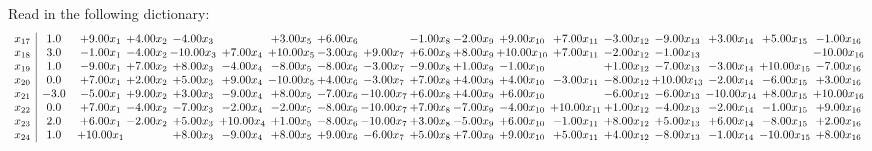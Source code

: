 \documentclass[9pt]{article}
\begin{document}
Read in the following dictionary:
\[\begin{array}{c| c c@{\hskip 2pt} c@{\hskip 2pt} c@{\hskip 2pt} c@{\hskip 2pt} c@{\hskip 2pt} c@{\hskip 2pt} c@{\hskip 2pt} c@{\hskip 2pt} c@{\hskip 2pt} c@{\hskip 2pt} c@{\hskip 2pt} c@{\hskip 2pt} c@{\hskip 2pt} c@{\hskip 2pt} c@{\hskip 2pt} c@{\hskip 2pt} }
 x_{17}   &  1.0 & +  9.00 x_{1} & +  4.00 x_{2} & -4.00 x_{3} &   & +  3.00 x_{5} & +  6.00 x_{6} &   & -1.00 x_{8} & -2.00 x_{9} & +  9.00 x_{10} & +  7.00 x_{11} & -3.00 x_{12} & -9.00 x_{13} & +  3.00 x_{14} & +  5.00 x_{15} & -1.00 x_{16}\\
 x_{18}   &  3.0 & -1.00 x_{1} & -4.00 x_{2} & -10.00 x_{3} & +  7.00 x_{4} & + 10.00 x_{5} & -3.00 x_{6} & +  9.00 x_{7} & +  6.00 x_{8} & +  8.00 x_{9} & + 10.00 x_{10} & +  7.00 x_{11} & -2.00 x_{12} & -1.00 x_{13} &    &   & -10.00 x_{16}\\
 x_{19}   &  1.0 & -9.00 x_{1} & +  7.00 x_{2} & +  8.00 x_{3} & -4.00 x_{4} & -8.00 x_{5} & -8.00 x_{6} & -3.00 x_{7} & -9.00 x_{8} & +  1.00 x_{9} & -1.00 x_{10} &   & +  1.00 x_{12} & -7.00 x_{13} & -3.00 x_{14} & + 10.00 x_{15} & -7.00 x_{16}\\
 x_{20}   &  0.0 & +  7.00 x_{1} & +  2.00 x_{2} & +  5.00 x_{3} & +  9.00 x_{4} & -10.00 x_{5} & +  4.00 x_{6} & -3.00 x_{7} & +  7.00 x_{8} & +  4.00 x_{9} & +  4.00 x_{10} & -3.00 x_{11} & -8.00 x_{12} & + 10.00 x_{13} & -2.00 x_{14} & -6.00 x_{15} & +  3.00 x_{16}\\
 x_{21}   &  -3.0 & -5.00 x_{1} & +  9.00 x_{2} & +  3.00 x_{3} & -9.00 x_{4} & +  8.00 x_{5} & -7.00 x_{6} & -10.00 x_{7} & +  6.00 x_{8} & +  4.00 x_{9} & +  6.00 x_{10} &   & -6.00 x_{12} & -6.00 x_{13} & -10.00 x_{14} & +  8.00 x_{15} & + 10.00 x_{16}\\
 x_{22}   &  0.0 & +  7.00 x_{1} & -4.00 x_{2} & -7.00 x_{3} & -2.00 x_{4} & -2.00 x_{5} & -8.00 x_{6} & -10.00 x_{7} & +  7.00 x_{8} & -7.00 x_{9} & -4.00 x_{10} & + 10.00 x_{11} & +  1.00 x_{12} & -4.00 x_{13} & -2.00 x_{14} & -1.00 x_{15} & +  9.00 x_{16}\\
 x_{23}   &  2.0 & +  6.00 x_{1} & -2.00 x_{2} & +  5.00 x_{3} & + 10.00 x_{4} & +  1.00 x_{5} & -8.00 x_{6} & -10.00 x_{7} & +  3.00 x_{8} & -5.00 x_{9} & +  6.00 x_{10} & -1.00 x_{11} & +  8.00 x_{12} & +  5.00 x_{13} & +  6.00 x_{14} & -8.00 x_{15} & +  2.00 x_{16}\\
 x_{24}   &  1.0 & + 10.00 x_{1} &   & +  8.00 x_{3} & -9.00 x_{4} & +  8.00 x_{5} & +  9.00 x_{6} & -6.00 x_{7} & +  5.00 x_{8} & +  7.00 x_{9} & +  9.00 x_{10} & +  5.00 x_{11} & +  4.00 x_{12} & -8.00 x_{13} & -1.00 x_{14} & -10.00 x_{15} & +  8.00 x_{16}\\

\end{array}\]
\end{document}
